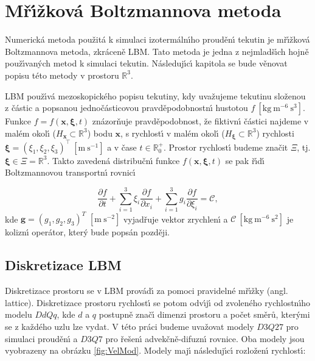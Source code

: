 
\chapter{M\v{r}\'{\i}\v{z}kov\'{a} Boltzmannova metoda}
\label{chap:NumMet}

\pagestyle{plain}

    Numerick\'{a} metoda pou\v{z}it\'{a} k simulaci izoterm\'{a}ln\'{\i}ho proud\v{e}n\'{\i} tekutin je m\v{r}\'{\i}\v{z}kov\'{a} Boltzmannova metoda, zkr\'{a}cen\v{e} LBM. Tato metoda je jedna z nejmlad\v{s}\'{\i}ch hojn\v{e} pou\v{z}\'{\i}van\'{y}ch metod k simulaci tekutin. N\'{a}sleduj\'{\i}c\'{\i} kapitola se bude v\v{e}novat popisu t\'{e}to metody v prostoru $\mathbb{R}^3$.
    
    LBM pou\v{z}\'{\i}v\'{a} mezoskopick\'{e}ho popisu tekutiny, kdy uva\v{z}ujeme tekutinu slo\v{z}enou z \v{c}\'{a}stic a popsanou jedno\v{c}\'{a}sticovou pravd\v{e}podobnostn\'{\i} hustotou $f \ [\mathrm{kg \ m^{-6} \ s^{3}}]$. Funkce $f = f(\boldsymbol{x},\boldsymbol{\xi},t)$ zn\'{a}zor\v{n}uje pravd\v{e}podobnost, \v{z}e fiktivn\'{\i} \v{c}\'{a}stici najdeme v mal\'{e}m okol\'{\i}  ($H_{\boldsymbol{x}} \subset \mathbb{R}^3$) bodu $\boldsymbol{x}$, s rychlost\'{\i} v mal\'{e}m okol\'{\i} ($H_{\boldsymbol{\xi}} \subset \mathbb{R}^3$) rychlosti $\boldsymbol{\xi} = (\xi_1,\xi_2,\xi_3)^\intercal \ [\mathrm{m \ s^{-1}}]$ a v \v{c}ase $t \in \mathbb{R}^+_0$. Prostor rychlost\'{\i} budeme zna\v{c}it $\Xi $, tj. $\boldsymbol{\xi} \in \Xi = \mathbb{R}^3$. Takto zaveden\'{a} distribu\v{c}n\'{\i} funkce $f(\boldsymbol{x}, \boldsymbol{\xi},t)$ se pak \v{r}\'{\i}d\'{\i} Boltzmannovou transportn\'{\i} rovnic\'{\i}

    \begin{equation}
    \label{eq:BolTraEqu}
        \frac{\partial f}{\partial t} + \sum_{i=1}^{3}\xi_i \frac{\partial f}{\partial x_i} + \sum_{i=1}^{3}g_i \frac{\partial f}{\partial \xi_i} = \mathcal{C},
    \end{equation}
    kde $\boldsymbol{g} = (g_1, g_2, g_3)^T$ $[\mathrm{m \ s^{-2}}]$ vyjad\v{r}uje vektor zrychlen\'{\i} a $\mathcal{C} \  [\mathrm{kg \ m^{-6} \ s^{2}}]$ je kolizn\'{\i} oper\'{a}tor, kter\'{y} bude pops\'{a}n pozd\v{e}ji.
    
    \section{Diskretizace LBM}
    \label{sec:DisComDom}
        
        Diskretizace prostoru se v LBM prov\'{a}d\'{\i} za pomoci pravideln\'{e} m\v{r}\'{\i}\v{z}ky (angl. lattice). Diskretizace prostoru rychlost\'{\i} se potom odv\'{\i}j\'{\i} od zvolen\'{e}ho rychlostn\'{\i}ho modelu $DdQq$, kde $d$ a $q$ postupn\v{e} zna\v{c}\'{\i} dimenzi prostoru a po\v{c}et sm\v{e}r\r{u}, kter\'{y}mi se z ka\v{z}d\'{e}ho uzlu lze vydat. V t\'{e}to pr\'{a}ci budeme uva\v{z}ovat modely $D3Q27$ pro simulaci proud\v{e}n\'{\i} a $D3Q7$ pro \v{r}e\v{s}en\'{\i} advek\v{c}n\v{e}-difuzn\'{\i} rovnice. Oba modely jsou vyobrazeny na obr\'{a}zku \ref{fig:VelMod}. Modely maj\'{\i} n\'{a}sleduj\'{\i}c\'{\i} rozlo\v{z}en\'{\i} rychlost\'{\i}:

